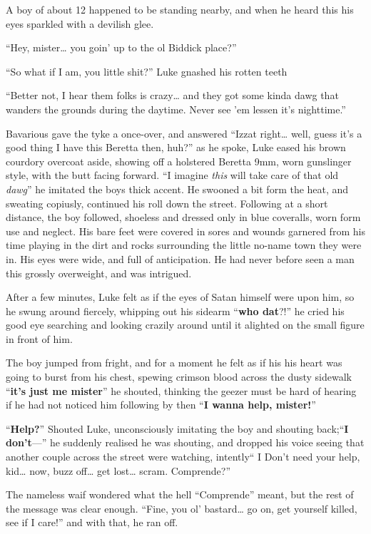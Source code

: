 A boy of about 12 happened to be standing nearby, and when he heard
this his eyes sparkled with a devilish glee.

``Hey, mister{\ldots} you goin' up to the ol Biddick place?''

``So what if I am, you little shit?'' Luke gnashed his rotten
teeth

``Better not, I hear them folks is crazy{\ldots} and they got some kinda
dawg that wanders the grounds during the daytime. Never see 'em
lessen it's nighttime.''

Bavarious gave the tyke a once-over, and answered ``Izzat
right{\ldots} well, guess it's a good thing I have this Beretta then,
huh?'' as he spoke, Luke eased his brown courdory overcoat aside,
showing off a holstered Beretta 9mm, worn gunslinger style, with the
butt facing forward. ``I imagine {\em this} will take care of that old
{\em dawg}'' he imitated the boys thick accent. He swooned a bit form
the heat, and sweating copiusly, continued his roll down the street.
Following at a short distance, the boy followed, shoeless and dressed
only in blue coveralls, worn form use and neglect. His bare feet were
covered in sores and wounds garnered from his time playing in the dirt
and rocks surrounding the little no-name town they were in. His eyes
were wide, and full of anticipation. He had never before seen a man this
grossly overweight, and was intrigued.

After a few minutes, Luke felt as if the eyes of Satan himself were
upon him, so he swung around fiercely, whipping out his sidearm
``{\bf who dat}?!'' he cried his good eye searching and looking crazily
around until it alighted on the small figure in front of him.

The boy jumped from fright, and for a moment he felt as if his his
heart was going to burst from his chest, spewing crimson blood
across the dusty sidewalk ``{\bf it's just me mister}'' he shouted,
thinking the geezer must be hard of hearing if he had not noticed
him following by then ``{\bf I wanna help, mister!}''

``{\bf Help?}'' Shouted Luke, unconsciously imitating the boy and
shouting back;``{\bf I don't}---'' he suddenly realised he was shouting,
and dropped his voice seeing that another couple across the street were
watching, intently`` I Don't need your help, kid{\ldots} now, buzz
off{\ldots} get lost{\ldots} scram. Comprende?''

The nameless waif wondered what the hell ``Comprende'' meant, but the
rest of the message was clear enough. ``Fine, you ol' bastard{\ldots} go
on, get yourself killed, see if I care!'' and with that, he ran
off.

